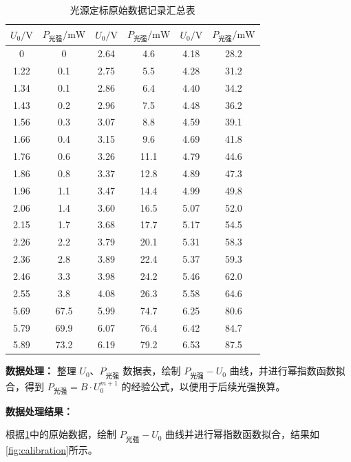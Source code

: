 \documentclass[11pt]{article}
\begin{document}
\begin{table}[htbp]
    \centering
    \caption{光源定标原始数据记录汇总表}
    \label{tab:calibration_raw}
    \begin{tabular}{cc|cc|cc}
        \toprule
        $U_0 / \text{V}$ & $P_{\text{光强}} / \text{mW}$ & $U_0 / \text{V}$ & $P_{\text{光强}} / \text{mW}$ & $U_0 / \text{V}$ & $P_{\text{光强}} / \text{mW}$ \\
        \midrule
        0    & 0   & 2.64 & 4.6  & 4.18 & 28.2 \\
        1.22 & 0.1 & 2.75 & 5.5  & 4.28 & 31.2 \\
        1.34 & 0.1 & 2.86 & 6.4  & 4.40 & 34.2 \\
        1.43 & 0.2 & 2.96 & 7.5  & 4.48 & 36.2 \\
        1.56 & 0.3 & 3.07 & 8.8  & 4.59 & 39.1 \\
        1.66 & 0.4 & 3.15 & 9.6  & 4.69 & 41.8 \\
        1.76 & 0.6 & 3.26 & 11.1 & 4.79 & 44.6 \\
        1.86 & 0.8 & 3.37 & 12.8 & 4.89 & 47.3 \\
        1.96 & 1.1 & 3.47 & 14.4 & 4.99 & 49.8 \\
        2.06 & 1.4 & 3.60 & 16.5 & 5.07 & 52.0 \\
        2.15 & 1.7 & 3.68 & 17.7 & 5.17 & 54.5 \\
        2.26 & 2.2 & 3.79 & 20.1 & 5.31 & 58.3 \\
        2.36 & 2.8 & 3.89 & 22.4 & 5.37 & 59.3 \\
        2.46 & 3.3 & 3.98 & 24.2 & 5.46 & 62.0 \\
        2.55 & 3.8 & 4.08 & 26.3 & 5.58 & 64.6 \\
        5.69 & 67.5 & 5.99 & 74.7 & 6.25 & 80.6 \\
        5.79 & 69.9 & 6.07 & 76.4 & 6.42 & 84.7 \\
        5.89 & 73.2 & 6.19 & 79.2 & 6.53 & 87.5 \\
        \bottomrule
    \end{tabular}
\end{table}

\textbf{数据处理：}
整理 $U_0$、$P_{\text{光强}}$ 数据表，绘制 $P_{\text{光强}} - U_0$ 曲线，并进行幂指数函数拟合，得到 $P_{\text{光强}} = B \cdot U_0^{m+1}$ 的经验公式，以便用于后续光强换算。

\textbf{数据处理结果：}

根据\cref{tab:calibration_raw}中的原始数据，绘制 $P_{\text{光强}} - U_0$ 曲线并进行幂指数函数拟合，结果如\cref{fig:calibration}所示。
\end{document}
